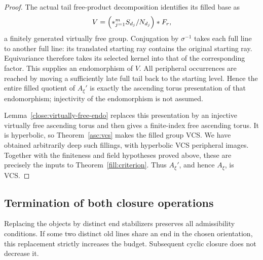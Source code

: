 \begin{proof}
The actual tail free-product decomposition identifies its filled
base as
\[
 V=\Bigl(*_{j=1}^m S_{d_j}/N_{d_j}\Bigr)*F_r,
\]
a finitely generated virtually free group. Conjugation by
$\sigma^{-1}$ takes each full line to another full line: its
translated starting ray contains the original starting ray.
Equivariance therefore takes its selected kernel into that of the
corresponding factor. This supplies an endomorphism of $V$.
All peripheral occurrences are reached by moving a sufficiently
late full tail back to the starting level. Hence the entire filled
quotient of $A_\xi'$ is exactly the ascending torus presentation
of that endomorphism; injectivity of the endomorphism is not assumed.

Lemma~\ref{close:virtually-free-endo} replaces this presentation by
an injective virtually free ascending torus and then gives a
finite-index free ascending torus. It is hyperbolic, so
Theorem~\ref{asc:vcs} makes the filled group VCS. We have obtained
arbitrarily deep such fillings, with hyperbolic VCS peripheral
images. Together with the finiteness and field hypotheses proved
above, these are precisely the inputs to
Theorem~\ref{fill:criterion}. Thus $A_\xi'$, and hence $A_\xi$, is VCS.
\end{proof}

\subsection{Termination of both closure operations}

\begin{proposition}\label{close:end-growth}
Replacing the objects by distinct end stabilizers preserves all
admissibility conditions. If some two distinct old lines share an end
in the chosen orientation, this replacement strictly increases the
budget. Subsequent cyclic closure does not decrease it.
\end{proposition}

